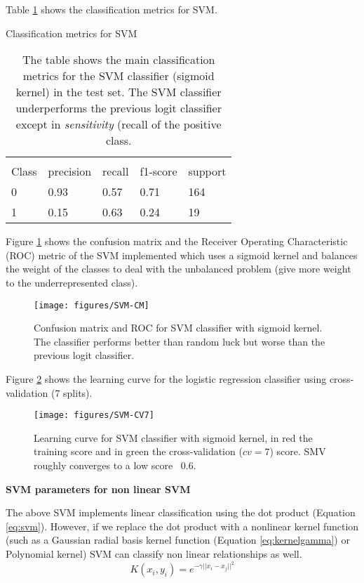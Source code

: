 \documentclass[11pt]{article}
\theoremstyle{definition}
\theoremstyle{remark}
\begin{document}
Table \ref{tab:svm} shows the classification metrics for SVM.
\begin{table}[H]
\caption{Classification metrics for SVM}
\begin{center} 
\begin{tabular}{lllll}
\hline
\multicolumn{1}{c}{} \\
Class & precision & recall & f1-score & support     \\
\hline
0 & 0.93  &    0.57   &   0.71   &    164 \\
1 & 0.15  &    0.63   &   0.24   &    19 \\
\hline
\end{tabular}
\caption{The table shows the main classification metrics for the SVM classifier (sigmoid kernel) in the test set. The SVM classifier underperforms the previous logit classifier except in \emph{sensitivity} (recall of the positive class.}  \label{tab:svm} 
\end{center}
\end{table}

Figure \ref{fig:svm-cm} shows the confusion matrix and the Receiver Operating Characteristic (ROC) metric of the SVM implemented which uses a sigmoid kernel and balances the weight of the classes to deal with the unbalanced problem (give more weight to the underrepresented class).
\begin{figure}[H]
        \centering
        \texttt{[image: figures/SVM-CM]}
        \caption{Confusion matrix and ROC for SVM classifier with sigmoid kernel. The classifier performs better than random luck but worse than the previous logit classifier.} \label{fig:svm-cm}
\end{figure}

Figure \ref{fig:svm-cv7} shows the learning curve for the logistic regression classifier using cross-validation (7 splits).
\begin{figure}[H]
        \centering
        \texttt{[image: figures/SVM-CV7]}
        \caption{Learning curve for SVM classifier with sigmoid kernel, in red the training score and in green the cross-validation ($cv=7$) score. SMV roughly converges to a low score ~0.6.
        } \label{fig:svm-cv7}
\end{figure}

\textbf{SVM parameters for non linear SVM}

The above SVM implements linear classification using the dot product (Equation \ref{eq:svm}). However, if we replace the dot product with a nonlinear kernel function (such as a Gaussian radial basis kernel function (Equation \ref{eq:kernelgamma}) or Polynomial kernel) SVM can classify non linear relationships as well.
\begin{equation} \label{eq:kernelgamma}
K(x_i,y_i) = e^{-\gamma ||x_i-x_j||^2}
\end{equation}
\end{document}
